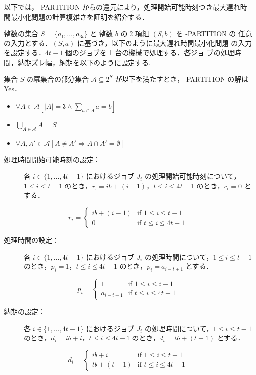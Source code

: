 \documentclass[12pt]{optlab-bachelor}
\begin{document}
以下では，{-PARTITION} からの還元により，処理開始可能時刻つき最大遅れ時間最小化問題の計算複雑さを証明を紹介する．

整数の集合 $S = \{a_1,\ldots,a_{3t}\}$ と 整数 $b$ の 2 項組 $(S,b)$ を {-PARTITION} の
任意の入力とする．$(S,a)$ に基づき，以下のように最大遅れ時間最小化問題
の入力を設定する．$4t - 1$ 個のジョブを 1 台の機械で処理する．各゙ジョ
ブの処理時間，納期ズレ幅，納期を以下のように設定する.

集合 $S$ の冪集合の部分集合 $\mathcal{A} \subseteq 2^{S}$ が以下を満たすとき，{-PARTITION} の解は Yes．
\begin{itemize}
  \item $\forall A \in \mathcal{A}[|A| = 3 \land \sum_{a \in A} a = b]$
  \item $\bigcup_{A \in \mathcal{A}} A = S$
  \item $\forall A, A' \in \mathcal{A}[A \neq A' \Rightarrow A \cap A' = \emptyset]$
\end{itemize}

\begin{description}
  \item[処理時間開始可能時刻の設定：] 各 $i \in \{1,\ldots,4t - 1\}$ におけるジョブ $J_i$ の処理開始可能時刻について，$1 \le i \le t - 1$ のとき，$r_i = ib + (i - 1)$，$t \le i \le 4t - 1$ のとき，$r_{i} = 0$ とする．
\end{description}
\begin{displaymath}
  r_i = \left\{ \begin{array}{ll} ib + (i - 1) & \text{if } 1 \le i \le t - 1 \\ 0 & \text{if } t \le i \le 4t - 1\end{array} \right.
\end{displaymath}
\begin{description}
  \item[処理時間の設定：] 各 $i \in \{1,\ldots,4t - 1\}$ におけるジョブ $J_i$ の処理時間について，$1 \le i \le t - 1$ のとき，$p_i = 1$，$t \le i \le 4t - 1$ のとき，$p_{i} = a_{i - t + 1}$ とする．
\end{description}
\begin{displaymath}
  p_i = \left\{ \begin{array}{ll} 1 & \text{if } 1 \le i \le t - 1 \\ a_{i - t + 1} & \text{if } t \le i \le 4t - 1\end{array} \right.
\end{displaymath}
\begin{description}
  \item[納期の設定：] 各 $i \in \{1,\ldots,4t - 1\}$ におけるジョブ $J_i$ の処理時間について，$1 \le i \le t - 1$ のとき，$d_i = ib + i$，$t \le i \le 4t - 1$ のとき，$d_i = tb + (t - 1)$ とする．
\end{description}
\begin{displaymath}
  d_i = \left\{ \begin{array}{ll} ib + i & \text{if } 1 \le i \le t - 1 \\ tb + (t - 1) & \text{if } t \le i \le 4t - 1\end{array} \right.
\end{displaymath}
\end{document}
